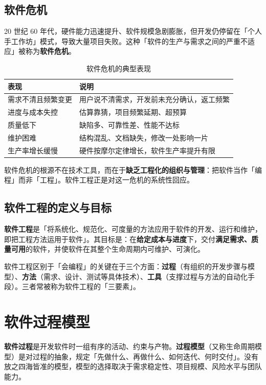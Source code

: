 \subsection{软件危机}

20 世纪 60 年代，硬件能力迅速提升、软件规模急剧膨胀，但开发仍停留在「个人手工作坊」模式，导致大量项目失败。这种「软件的生产与需求之间的严重不适应」被称为\textbf{软件危机}。

\begin{table}[H]
\centering
\caption{软件危机的典型表现}
\begin{tabulary}{\textwidth}{LL}
\toprule
表现 & 说明 \\
\midrule
需求不清且频繁变更 & 用户说不清需求，开发前未充分确认，返工频繁 \\
进度与成本失控 & 估算靠猜，项目频繁延期、超预算 \\
质量低下 & 缺陷多、可靠性差、性能不达标 \\
维护困难 & 结构混乱、文档缺失，修改一处影响一片 \\
生产率增长缓慢 & 硬件按摩尔定律增长，软件生产率提升有限 \\
\bottomrule
\end{tabulary}
\end{table}

\noindent 软件危机的根源不在技术工具，而在于\textbf{缺乏工程化的组织与管理}：把软件当作「编程」而非「工程」。软件工程正是对这一危机的系统性回应。

\subsection{软件工程的定义与目标}

\textbf{软件工程}是「将系统化、规范化、可度量的方法应用于软件的开发、运行和维护，即把工程方法运用于软件」。其目标是：在\textbf{给定成本与进度}下，交付\textbf{满足需求、质量可用}的软件，并使软件在其整个生命周期内可维护、可演化。

软件工程区别于「会编程」的关键在于三个方面：\textbf{过程}（有组织的开发步骤与模型）、\textbf{方法}（需求、设计、测试等具体技术）、\textbf{工具}（支撑过程与方法的自动化手段）。三者常被称为软件工程的「三要素」。

\section{软件过程模型}

\textbf{软件过程}是开发软件时一组有序的活动、约束与产物。\textbf{过程模型}（又称生命周期模型）是对过程的抽象，规定「先做什么、再做什么、如何迭代、何时交付」。没有放之四海皆准的模型，模型的选择取决于需求稳定性、项目规模、风险水平与团队能力。

